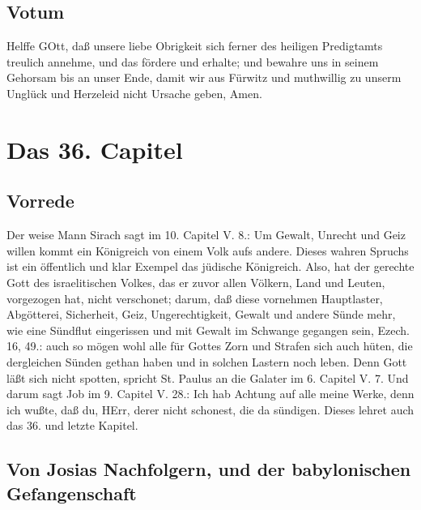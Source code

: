 \section{Votum}

Helffe GOtt, daß unsere liebe Obrigkeit sich ferner des heiligen Predigtamts treulich annehme, und das fördere und erhalte; und bewahre uns in seinem Gehorsam bis an unser Ende, damit wir aus Fürwitz und muthwillig zu unserm Unglück und Herzeleid nicht Ursache geben, Amen.

\chapter{Das 36. Capitel}

\section{Vorrede}

Der weise Mann Sirach sagt im 10. Capitel V. 8.: Um Gewalt, Unrecht und Geiz willen kommt ein Königreich von einem Volk aufs andere. Dieses wahren Spruchs ist ein öffentlich und klar Exempel das jüdische Königreich. Also, hat der gerechte Gott des israelitischen Volkes, das er zuvor allen Völkern, Land und Leuten, vorgezogen hat, nicht verschonet; darum, daß diese vornehmen Hauptlaster, Abgötterei, Sicherheit, Geiz, Ungerechtigkeit, Gewalt und andere Sünde mehr, wie eine Sündflut eingerissen und mit Gewalt im Schwange gegangen sein, Ezech. 16, 49.: auch so mögen wohl alle für Gottes Zorn und Strafen sich auch hüten, die dergleichen Sünden gethan haben und in solchen Lastern noch leben. Denn Gott läßt sich nicht spotten, spricht St. Paulus an die Galater im 6. Capitel V. 7. Und darum sagt Job im 9. Capitel V. 28.: Ich hab Achtung auf alle meine Werke, denn ich wußte, daß du, HErr, derer nicht schonest, die da sündigen. Dieses lehret auch das 36. und letzte Kapitel.

\section[Von Josias Nachfolgern, und der babylonischen Gefangenschaft]{Von Josias Nachfolgern, und der babylonischen Gefangenschaft}
